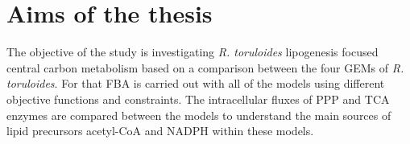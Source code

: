\chapter{Aims of the thesis}

The objective of the study is investigating \textit{R. toruloides} lipogenesis
focused central carbon metabolism based on a comparison between the four GEMs of \textit{R. toruloides}.
For that FBA is carried out with all of the models using different objective functions and constraints. 
The intracellular fluxes of PPP and TCA enzymes are compared between the models to understand the main 
sources of lipid precursors acetyl-CoA and NADPH within these models. 
